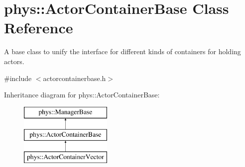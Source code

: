 \hypertarget{classphys_1_1ActorContainerBase}{
\section{phys::ActorContainerBase Class Reference}
\label{d1/d00/classphys_1_1ActorContainerBase}
}


A base class to unify the interface for different kinds of containers for holding actors.  




{\ttfamily \#include $<$actorcontainerbase.h$>$}

Inheritance diagram for phys::ActorContainerBase:\begin{figure}[H]
\begin{center}
\leavevmode
\includegraphics[height=3.000000cm]{d1/d00/classphys_1_1ActorContainerBase}
\end{center}
\end{figure}
